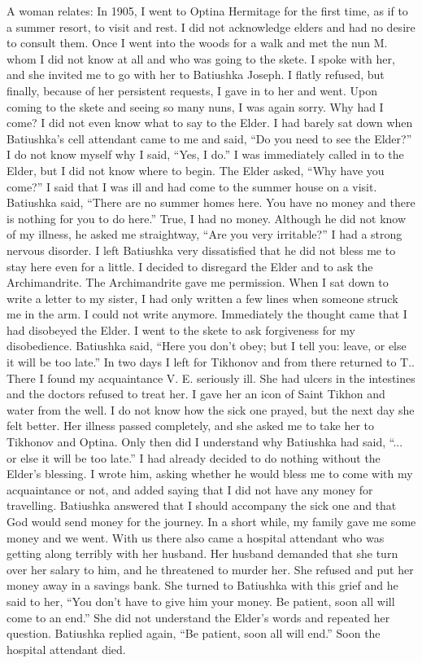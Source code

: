 \begin{longquote}{A woman relates:}
In 1905, I went to Optina Hermitage for the first time, as if to a summer resort, to visit and rest. I did not acknowledge elders and had no desire to consult them. Once I went into the woods for a walk and met the nun M. whom I did not know at all and who was going to the skete. I spoke with her, and she invited me to go with her to Batiushka Joseph. I flatly refused, but finally, because of her persistent requests, I gave in to her and went. Upon coming to the skete and seeing so many nuns, I was again sorry. Why had I come? I did not even know what to say to the Elder. I had barely sat down when Batiushka's cell attendant came to me and said, ``Do you need to see the Elder?'' I do not know myself why I said, ``Yes, I do.'' I was immediately called in to the Elder, but I did not know where to begin. The Elder asked, ``Why have you come?'' I said that I was ill and had come to the summer house on a visit. Batiushka said, ``There are no summer homes here. You have no money and there is nothing for you to do here.'' True, I had no money. Although he did not know of my illness, he asked me straightway, ``Are you very irritable?'' I had a strong nervous disorder. I left Batiushka very dissatisfied that he did not bless me to stay here even for a little. I decided to disregard the Elder and to ask the Archimandrite. The Archimandrite gave me permission. When I sat down to write a letter to my sister, I had only written a few lines when someone struck me in the arm. I could not write anymore. Immediately the thought came that I had disobeyed the Elder. I went to the skete to ask forgiveness for my disobedience. Batiushka said, ``Here you don't obey; but I tell you: leave, or else it will be too late.'' In two days I left for Tikhonov and from there returned to T.. There I found my acquaintance V. E. seriously ill. She had ulcers in the intestines and the doctors refused to treat her. I gave her an icon of Saint Tikhon and water from the well. I do not know how the sick one prayed, but the next day she felt better. Her illness passed completely, and she asked me to take her to Tikhonov and Optina. Only then did I understand why Batiushka had said, ``... or else it will be too late.'' I had already decided to do nothing without the Elder's blessing. I wrote him, asking whether he would bless me to come with my acquaintance or not, and added saying that I did not have any money for travelling. Batiushka answered that I should accompany the sick one and that God would send money for the journey. In a short while, my family gave me some money and we went. With us there also came a hospital attendant who was getting along terribly with her husband. Her husband demanded that she turn over her salary to him, and he threatened to murder her. She refused and put her money away in a savings bank. She turned to Batiushka with this grief and he said to her, ``You don't have to give him your money. Be patient, soon all will come to an end.'' She did not understand the Elder's words and repeated her question. Batiushka replied again, ``Be patient, soon all will end.'' Soon the hospital attendant died.


\end{longquote}
